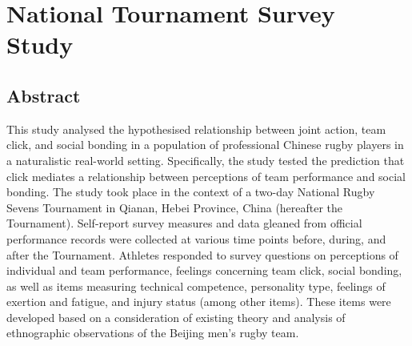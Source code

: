 \chapter{\label{chap:tournamentSurvey}National Tournament Survey Study}
                                            \begin{CJK}{UTF8}{gbsn}

\minitoc
\section{Abstract}

This study analysed the hypothesised relationship between joint action, team click, and social bonding in a population of professional Chinese rugby players in a naturalistic real-world setting.  Specifically, the study tested the prediction that click mediates a relationship between perceptions of team performance and social bonding.  The study took place in the context of a two-day National Rugby Sevens Tournament in Qianan, Hebei Province, China (hereafter the Tournament).  Self-report survey measures and data gleaned from official performance records were collected at various time points before, during, and after the Tournament.  Athletes responded to survey questions on perceptions of individual and team performance, feelings concerning team click, social bonding, as well as items measuring technical competence, personality type, feelings of exertion and fatigue, and injury status (among other items). These items were developed based on a consideration of existing theory and analysis of ethnographic observations of the Beijing men's rugby team.


\end{CJK}
